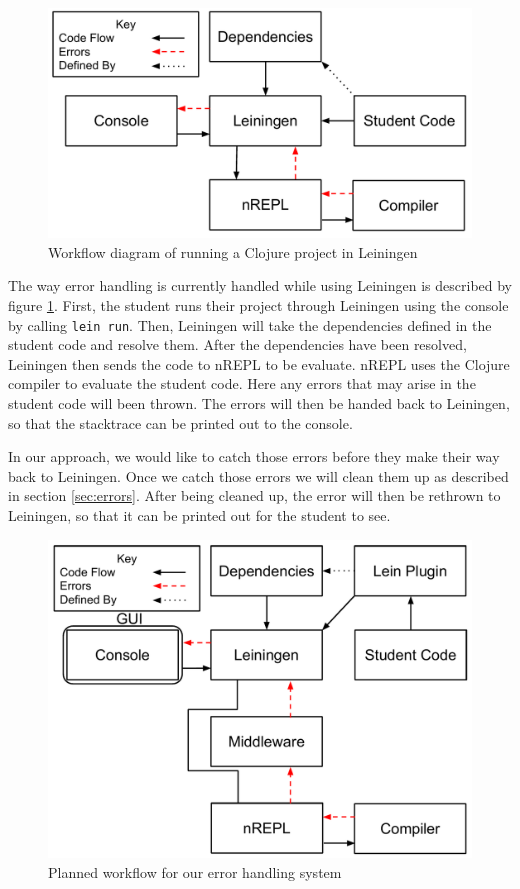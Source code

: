 \documentclass[12pt]{article}
\begin{document}
\begin{figure}[h]
 \includegraphics[width=12cm]{CurrentErrorHandling.pdf}
 \centering
 \caption{Workflow diagram of running a Clojure project in Leiningen}
 \label{fig:CurrentError}
\end{figure}

The way error handling is currently handled while using Leiningen is described by figure \ref{fig:CurrentError}. First, the student runs their project through Leiningen using the console by calling \texttt{lein run}. Then, Leiningen will take the dependencies defined in the student code and resolve them. After the dependencies have been resolved, Leiningen then sends the code to nREPL to be evaluate. nREPL uses the Clojure compiler to evaluate the student code. Here any errors that may arise in the student code will been thrown. The errors will then be handed back to Leiningen, so that the stacktrace can be printed out to the console.

In our approach, we would like to catch those errors before they make their way back to Leiningen. Once we catch those errors we will clean them up as described in section \ref{sec:errors}. After being cleaned up, the error will then be rethrown to Leiningen, so that it can be printed out for the student to see.

\begin{figure}[h]
 \includegraphics[width=12cm]{OurErrorHandlingSystem.pdf}
 \centering
  \caption{Planned workflow for our error handling system}
 \label{fig:OurSystem}
\end{figure}
\end{document}
